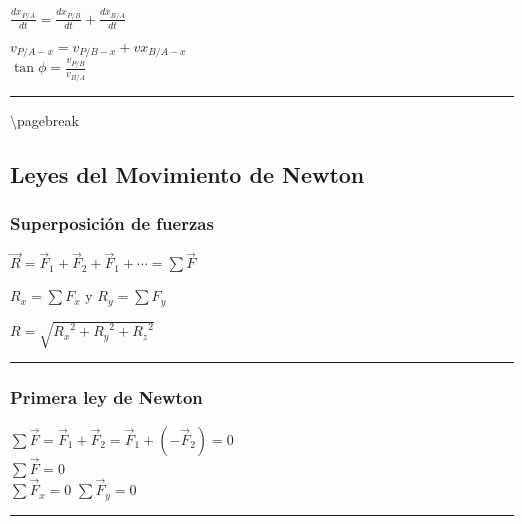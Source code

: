 \documentclass[
]{article}
\begin{document}
{\(\frac{dx_{P/A}}{dt} = \frac{dx_{P/B}}{dt} + \frac{dx_{B/A}}{dt}\)}

{\(v_{P/A - x} = v_{P/B - x} + vx_{B/A - x}\)}\\
{\(\tan\phi = \frac{v_{P/B}}{v_{B/A}}\)}

\begin{center}\rule{0.5\linewidth}{0.5pt}\end{center}

\textbackslash pagebreak

\hypertarget{leyes-del-movimiento-de-newton}{%
\subsection{Leyes del Movimiento de
Newton}\label{leyes-del-movimiento-de-newton}}

\hypertarget{superposiciuxf3n-de-fuerzas}{%
\subsubsection{Superposición de
fuerzas}\label{superposiciuxf3n-de-fuerzas}}

{\(\overset{\rightarrow}{R} = {\overset{\rightarrow}{F}}_{1} + {\overset{\rightarrow}{F}}_{2} + {\overset{\rightarrow}{F}}_{1} + \cdots = \sum\overset{\rightarrow}{F}\)}

{\(R_{x} = \sum F_{x}\)} y {\(R_{y} = \sum F_{y}\)}

{\(R = \sqrt{{R_{x}}^{2} + {R_{y}}^{2} + {R_{z}}^{2}}\)}

\begin{center}\rule{0.5\linewidth}{0.5pt}\end{center}

\hypertarget{primera-ley-de-newton}{%
\subsubsection{Primera ley de Newton}\label{primera-ley-de-newton}}

{\(\sum\overset{\rightarrow}{F} = {\overset{\rightarrow}{F}}_{1} + {\overset{\rightarrow}{F}}_{2} = {\overset{\rightarrow}{F}}_{1} + ( - {\overset{\rightarrow}{F}}_{2}) = 0\)}\\
{\(\sum\overset{\rightarrow}{F} = 0\)}\\
{\(\sum{\overset{\rightarrow}{F}}_{x} = 0\)}
{\(\sum{\overset{\rightarrow}{F}}_{y} = 0\)}

\begin{center}\rule{0.5\linewidth}{0.5pt}\end{center}
\end{document}
